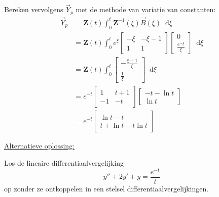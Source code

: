 \documentclass[kulak]{kulakarticle} %
\newcommand*\diff{\mathop{}\!\mathrm{d}}
\begin{document}
\begin{enumerate}
	Bereken vervolgens \(\vec{Y}_p\) met de methode van variatie van constanten:
	\begin{align*}
		\vec{Y}_p	 &= \textbf{Z}(t) \int_{0}^{t} \textbf{Z}^{-1}(\xi)\vec{B}(\xi) \diff{\xi}\\
					&= \textbf{Z}(t) \int_{0}^{t} e^{\xi} \begin{bmatrix}
						-\xi & -\xi-1 \\
						1 & 1
					\end{bmatrix} \begin{bmatrix}
					0 \\
					\frac{e^{-\xi}}{\xi}
					\end{bmatrix} \diff{\xi}\\
					&= \textbf{Z}(t) \int_{0}^{t} \begin{bmatrix}
						-\frac{\xi+1}{\xi} \\
						\frac{1}{\xi}
					\end{bmatrix} \diff{\xi} \\
					&=e^{-t} \begin{bmatrix}
						1 & t+1 \\
						-1 & -t
					\end{bmatrix} \begin{bmatrix}
					-t-\ln{t}\\
					\ln{t} \end{bmatrix}\\
					&= e^{-t} \begin{bmatrix}
					\ln{t}-t\\
					t+\ln{t}-t\ln{t}
					\end{bmatrix}
	\end{align*}

	\underline{Alternatieve oplossing:}

	Los de lineaire differentiaalvergelijking \[y''+2y'+y=\frac{e^{-t}}{t}\] op zonder ze ontkoppelen in een stelsel differentiaalvergelijkingen.



\end{enumerate}
\end{document}
